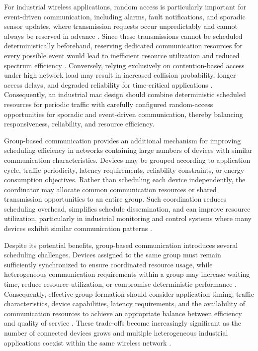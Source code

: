 \documentclass[12pt,a4paper]{article}
\begin{document}
For industrial wireless applications, random access is particularly important for event-driven communication, including alarms, fault notifications, and sporadic sensor updates, where transmission requests occur unpredictably and cannot always be reserved in advance \cite{willigWirelessTechnologyIndustrial2005,vitturiIndustrialWirelessNetworks2013,wollschlaegerFutureIndustrialCommunication2017a}. Since these transmissions cannot be scheduled deterministically beforehand, reserving dedicated communication resources for every possible event would lead to inefficient resource utilization and reduced spectrum efficiency \cite{andrewsProvidingQualityService2001}. Conversely, relying exclusively on contention-based access under high network load may result in increased collision probability, longer access delays, and degraded reliability for time-critical applications \cite{fattahOverviewSchedulingAlgorithms2002a,gaidamakaOptimizingDelaysRandom2025}. Consequently, an industrial \gls{mac} design should combine deterministic scheduled resources for periodic traffic with carefully configured random-access opportunities for sporadic and event-driven communication, thereby balancing responsiveness, reliability, and resource efficiency.

Group-based communication provides an additional mechanism for improving scheduling efficiency in networks containing large numbers of devices with similar communication characteristics. Devices may be grouped according to application cycle, traffic periodicity, latency requirements, reliability constraints, or energy-consumption objectives. Rather than scheduling each device independently, the coordinator may allocate common communication resources or shared transmission opportunities to an entire group. Such coordination reduces scheduling overhead, simplifies schedule dissemination, and can improve resource utilization, particularly in industrial monitoring and control systems where many devices exhibit similar communication patterns \cite{etsi_ts103636_4}.

Despite its potential benefits, group-based communication introduces several scheduling challenges. Devices assigned to the same group must remain sufficiently synchronized to ensure coordinated resource usage, while heterogeneous communication requirements within a group may increase waiting time, reduce resource utilization, or compromise deterministic performance \cite{willigWirelessTechnologyIndustrial2005,vitturiIndustrialWirelessNetworks2013}. Consequently, effective group formation should consider application timing, traffic characteristics, device capabilities, latency requirements, and the availability of communication resources to achieve an appropriate balance between efficiency and quality of service \cite{andrewsProvidingQualityService2001,fattahOverviewSchedulingAlgorithms2002a}. These trade-offs become increasingly significant as the number of connected devices grows and multiple heterogeneous industrial applications coexist within the same wireless network \cite{wollschlaegerFutureIndustrialCommunication2017a}.
\end{document}
